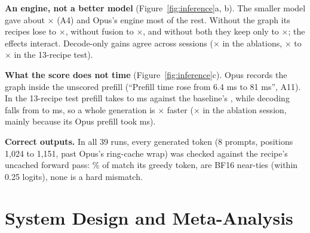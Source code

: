 \documentclass{article}
\newif\ifshowhumanmarkers \showhumanmarkersfalse
\newcommand{\humantag}[1]{{\color{humanframe}\sffamily\scriptsize\bfseries HUMAN AUTHOR MUST REWRITE/VERIFY [#1]}\ }
\newcommand{\humanauthor}[2][]{\ifshowhumanmarkers\begin{humanbox}\humantag{#1}#2\end{humanbox}\else #2\par\fi}
\begin{document}
 \textbf{An engine, not a better model} (Figure~\ref{fig:inference}a, b). The smaller model gave about \CRNineGptDecX$\times$ (A4) and Opus's engine most of the rest. Without the graph its recipes lose \CRIAGraphLo{} to \CRIAGraphHi$\times$, without fusion \CRIAFusionLo{} to \CRIAFusionHi$\times$, and without both they keep only \CRIAArchLo{} to \CRIAArchHi$\times$; the effects interact. Decode-only gains agree across sessions (\CRThreeDecX$\times$ in the ablations, \CRSixSpeedLo$\times$ to \CRSixSpeedHi$\times$ in the 13-recipe test).

 \textbf{What the score does not time} (Figure~\ref{fig:inference}c). Opus records the graph inside the unscored prefill (``Prefill time rose from 6.4 ms to 81 ms'', A11). In the 13-recipe test prefill takes \CRSixPrefillLo{} to \CRSixPrefillHi{} ms against the baseline's \CRSixBasePrefill, while decoding falls from \CRSixBaseDecDms{} to \CRSixOpDecDms{} ms, so a whole generation is \CRSixEtoEXLo$\times$ faster (\CRThreeEtoEX$\times$ in the ablation session, mainly because its Opus prefill took \CRThreePreOpus{} ms).

 \textbf{Correct outputs.} In all 39 runs, every generated token (8 prompts, positions 1{,}024 to 1{,}151, past Opus's ring-cache wrap) was checked against the recipe's uncached forward pass: \CRSixAgreePct\% of \CRSixTokensChecked{} match its greedy token, \CRSixNearTies{} are BF16 near-ties (within 0.25 logits), none is a hard mismatch.
\label{partoneend}

\clearpage
\section{System Design and Meta-Analysis}\label{parttwo}
\end{document}
